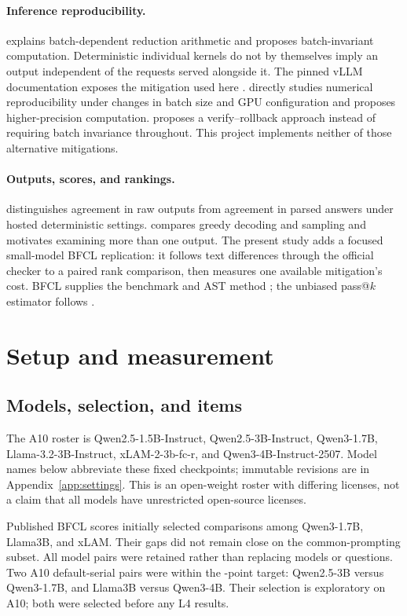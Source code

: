 \documentclass[10pt,twocolumn]{article}
\begin{document}
\paragraph{Inference reproducibility.}
\citet{he2025nondeterminism} explains batch-dependent reduction arithmetic and proposes batch-invariant computation. Deterministic individual kernels do not by themselves imply an output independent of the requests served alongside it. The pinned vLLM documentation exposes the mitigation used here \citep{vllm032}. \citet{yuan2025numerical} directly studies numerical reproducibility under changes in batch size and GPU configuration and proposes higher-precision computation. \citet{gond2026llm42} proposes a verify--rollback approach instead of requiring batch invariance throughout. This project implements neither of those alternative mitigations.

\paragraph{Outputs, scores, and rankings.}
\citet{atil2025hosted} distinguishes agreement in raw outputs from agreement in parsed answers under hosted deterministic settings. \citet{song2025greedy} compares greedy decoding and sampling and motivates examining more than one output. The present study adds a focused small-model BFCL replication: it follows text differences through the official checker to a paired rank comparison, then measures one available mitigation's cost. BFCL supplies the benchmark and AST method \citep{patil2025bfcl}; the unbiased pass@$k$ estimator follows \citet{chen2021code}.

\section{Setup and measurement}
\subsection{Models, selection, and items}
The A10 roster is Qwen2.5-1.5B-Instruct, Qwen2.5-3B-Instruct, Qwen3-1.7B, Llama-3.2-3B-Instruct, xLAM-2-3b-fc-r, and Qwen3-4B-Instruct-2507. Model names below abbreviate these fixed checkpoints; immutable revisions are in Appendix~\ref{app:settings}. This is an open-weight roster with differing licenses, not a claim that all models have unrestricted open-source licenses.

Published BFCL scores initially selected comparisons among Qwen3-1.7B, Llama3B, and xLAM. Their gaps did not remain close on the common-prompting subset. All model pairs were retained rather than replacing models or questions. Two A10 default-serial pairs were within the \TargetGap{}-point target: Qwen2.5-3B versus Qwen3-1.7B, and Llama3B versus Qwen3-4B. Their selection is exploratory on A10; both were selected before any L4 results.
\end{document}
